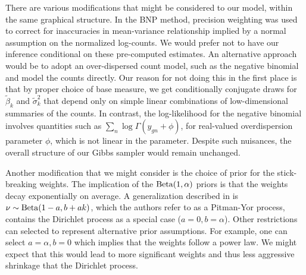 There are various modifications that might be considered to our model, within the same graphical structure. In the BNP method, precision weighting was used to correct for inaccuracies in mean-variance relationship implied by a normal assumption on the normalized log-counts. We would prefer not to have our inference conditional on these pre-computed estimates. An alternative approach would be to adopt an over-dispersed count model, such as the negative binomial and model the counts directly. Our reason for not doing this in the first place is that by proper choice of base measure, we get conditionally conjugate draws for $\tilde{\beta}_k$ and $\tilde{\sigma}^2_k$ that depend only on simple linear combinations of low-dimensional summaries of the counts. In contrast, the log-likelihood for the negative binomial involves quantities such as $\sum_n \log \Gamma(y_{gn}+\phi)$, for real-valued overdispersion parameter $\phi$, which is not linear in the parameter. Despite such nuisances, the overall structure of our Gibbs sampler would remain unchanged.

Another modification that we might consider is the choice of prior for the stick-breaking weights. The implication of the $\operatorname{Beta}(1, \alpha)$ priors is that the weights decay exponentially on average. A generalization described in \cite{ishwaran2001} is $\nu \sim \operatorname{Beta}(1-a, b + ak)$, which the authors refer to as a Pitman-Yor process, contains the Dirichlet process as a special case ($a=0,b=\alpha$). Other restrictions can selected to represent alternative prior assumptions. For example, one can select $a=\alpha, b=0$ which implies that the weights follow a power law. We might expect that this would lead to more significant weights and thus less aggressive shrinkage that the Dirichlet process.



